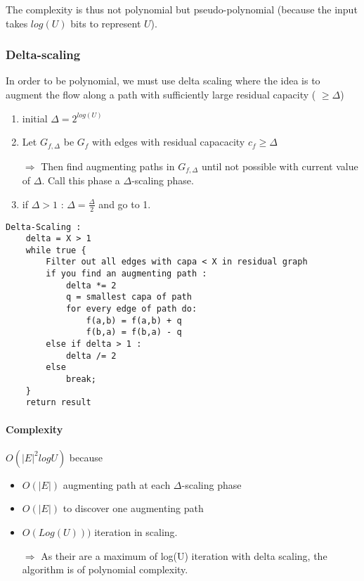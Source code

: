 The complexity is thus not polynomial but
pseudo-polynomial (because the input takes $log(U)$ bits to represent
$U$). 

\subsubsection{Delta-scaling}
In order to be polynomial, we must use
delta scaling where the idea is to augment the flow along a path with sufficiently large
residual capacity ( $\geqslant \Delta$)

\begin{enumerate}
    \item initial $\Delta = 2^{log(U)}$
    \item Let $G_{f,\Delta}$ be $G_f$ with edges with residual capacacity $c_f \geq \Delta$ 

        $\Rightarrow$ Then find augmenting paths in $G_{f,\Delta}$ until not
        possible with current value of $\Delta$. Call this phase a
        $\Delta$-scaling phase.

    \item if $\Delta > 1$ : $\Delta = \frac{\Delta}{2}$ and go to 1.

\end{enumerate}

\begin{lstlisting}
Delta-Scaling :
    delta = X > 1
    while true {
        Filter out all edges with capa < X in residual graph
        if you find an augmenting path :
            delta *= 2
            q = smallest capa of path
            for every edge of path do:
                f(a,b) = f(a,b) + q
                f(b,a) = f(b,a) - q
        else if delta > 1 :
            delta /= 2
        else
            break;
    }
    return result
\end{lstlisting}

\paragraph{Complexity}
$O(|E|^2 log U)$ because 
\begin{itemize} 
        \item $O(|E|)$ augmenting path at each $\Delta$-scaling phase
        \item $O(|E|)$ to discover one augmenting path
        \item $O(Log(U)))$ iteration in scaling.
            
            $\Rightarrow$ As their are a maximum of log(U) iteration with delta scaling, the
            algorithm is of polynomial complexity.
    \end{itemize}

